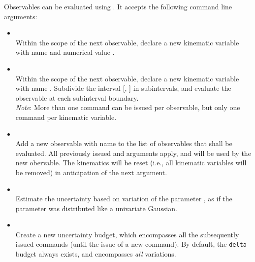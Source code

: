 Observables can be evaluated using . It accepts
the following command line arguments:
\begin{itemize}
    \item[] \\[\medskipamount]
        Within the scope of the next observable, declare a new kinematic
        variable with name  and numerical value .

    \item[] \\[\medskipamount]
        Within the scope of the next observable, declare a new kinematic
        variable with name . Subdivide the interval [, ]
        in  subintervals, and evaluate the observable at each subinterval
        boundary.\\

        \emph{Note}: More than one  command can be issued per
        observable, but only one  command per kinematic variable.

    \item[] \\[\medskipamount]
        Add a new observable with name  to the list of observables
        that shall be evaluated. All previously issued 
        and  arguments apply, and will be used by the new obervable.
        The kinematics will be reset (i.e., all kinematic variables will be removed)
        in anticipation of the next  argument.

    \item[] \\[\medskipamount]
        Estimate the uncertainty based on variation of the parameter ,
        as if the parameter was distributed like a univariate Gaussian.

    \item[] \\[\medskipamount]
        Create a new uncertainty budget, which encompasses all the subsequently issued
         commands (until the issue of a new  command).
        By default, the \texttt{delta} budget always exists, and encompasses \emph{all}
        variations.
\end{itemize}

